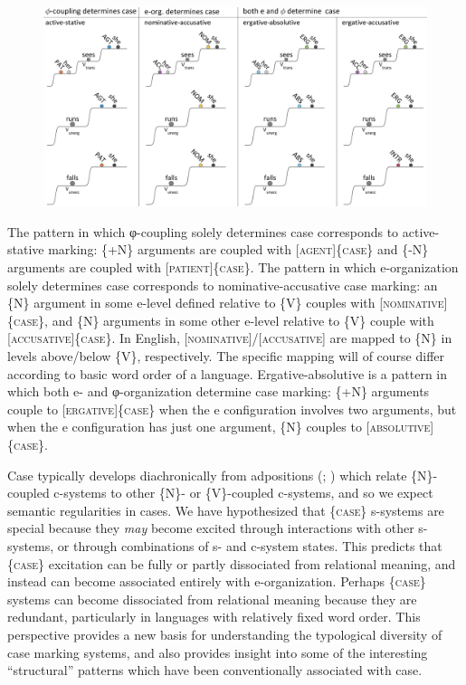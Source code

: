   
\begin{figure}
\includegraphics[width=\textwidth]{figures/Tilsen-img70.png}
\caption{\missingcaption}
\label{fig:}
\end{figure}
 

  The pattern in which φ-coupling solely determines case corresponds to active-stative marking: \{+N\} arguments are coupled with [\textsc{agent}]\{\textsc{case}\} and \{-N\} arguments are coupled with [\textsc{patient}]\{\textsc{case}\}. The pattern in which e-organization solely determines case corresponds to nominative-accusative case marking: an \{N\} argument in some e-level defined relative to \{V\} couples with [\textsc{nominative}]\{\textsc{case}\}, and \{N\} arguments in some other e-level relative to \{V\} couple with [\textsc{accusative}]\{\textsc{case\}}. In English, [\textsc{nominative}]/[\textsc{accusative}] are mapped to \{N\} in levels above/below \{V\}, respectively. The specific mapping will of course differ according to basic word order of a language. Ergative-absolutive is a pattern in which both e- and φ-organization determine case marking: \{+N\} arguments couple to [\textsc{ergative}]\{\textsc{case}\} when the e configuration involves two arguments, but when the e configuration has just one argument, \{N\} couples to [\textsc{absolutive}]\{\textsc{case}\}.

  Case typically develops diachronically from adpositions (\citealt{Heine2009}; \citealt{TraugottHeine1991}) which relate \{N\}-coupled c-systems to other \{N\}- or \{V\}-coupled c-systems, and so we expect semantic regularities in cases. We have hypothesized that \{\textsc{case}\} s-systems are special because they \textit{may} become excited through interactions with other s-systems, or through combinations of s- and c-system states. This predicts that \{\textsc{case}\} excitation can be fully or partly dissociated from relational meaning, and instead can become associated entirely with e-organization. Perhaps \{\textsc{case}\} systems can become dissociated from relational meaning because they are redundant, particularly in languages with relatively fixed word order. This perspective provides a new basis for understanding the typological diversity of case marking systems, and also provides insight into some of the interesting “structural” patterns which have been conventionally associated with case. 

